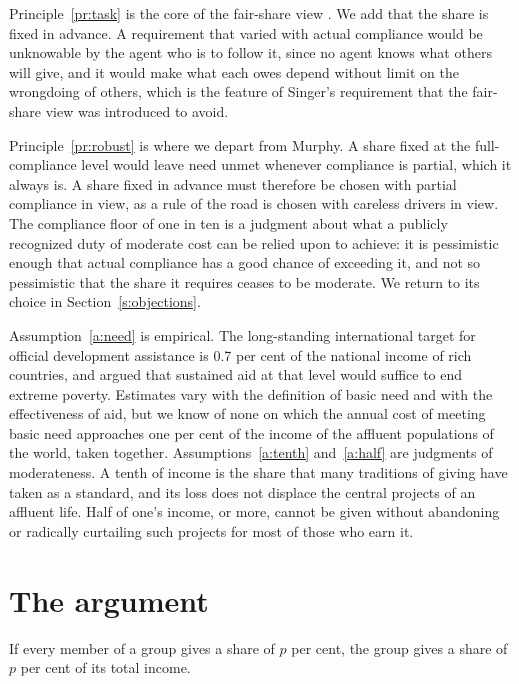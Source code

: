 \documentclass{situationist-preprint}
\begin{document}
Principle~\ref{pr:task} is the core of the fair-share view \citep{Murphy2000}. We add that the share is fixed in advance. A requirement that varied with actual compliance would be unknowable by the agent who is to follow it, since no agent knows what others will give, and it would make what each owes depend without limit on the wrongdoing of others, which is the feature of Singer's requirement that the fair-share view was introduced to avoid.

Principle~\ref{pr:robust} is where we depart from Murphy. A share fixed at the full-compliance level would leave need unmet whenever compliance is partial, which it always is. A share fixed in advance must therefore be chosen with partial compliance in view, as a rule of the road is chosen with careless drivers in view. The compliance floor of one in ten is a judgment about what a publicly recognized duty of moderate cost can be relied upon to achieve: it is pessimistic enough that actual compliance has a good chance of exceeding it, and not so pessimistic that the share it requires ceases to be moderate. We return to its choice in Section~\ref{s:objections}.

Assumption~\ref{a:need} is empirical. The long-standing international target for official development assistance is 0.7 per cent of the national income of rich countries, and \citet{Sachs2005} argued that sustained aid at that level would suffice to end extreme poverty. Estimates vary with the definition of basic need and with the effectiveness of aid, but we know of none on which the annual cost of meeting basic need approaches one per cent of the income of the affluent populations of the world, taken together. Assumptions~\ref{a:tenth} and~\ref{a:half} are judgments of moderateness. A tenth of income is the share that many traditions of giving have taken as a standard, and its loss does not displace the central projects of an affluent life. Half of one's income, or more, cannot be given without abandoning or radically curtailing such projects for most of those who earn it.

\section{The argument}

\begin{lemma}\label{l:sum}
If every member of a group gives a share of $p$ per cent, the group gives a share of $p$ per cent of its total income.
\end{lemma}
\end{document}
